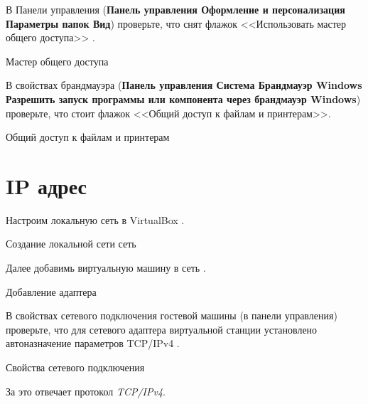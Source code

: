В Панели управления (\textbf{Панель управления
\rarrow Оформление и персонализация \rarrow Параметры папок \rarrow Вид})
проверьте, что снят флажок <<Использовать мастер общего доступа>>
.

\begin{image}
	\caption{Мастер общего доступа}
	\label{fig:flag:master:share}
\end{image}

В свойствах брандмауэра (\textbf{Панель управления \rarrow Система
\rarrow Брандмауэр Windows
\rarrow Разрешить запуск программы или компонента через брандмауэр Windows})
проверьте, что стоит флажок <<Общий доступ к файлам и принтерам>>.

\begin{image}
	\caption{Общий доступ к файлам и принтерам}
	\label{fig:flag:share:file}
\end{image}

\section{IP адрес}

Настроим локальную сеть в VirtualBox .

\begin{image}
	\caption{Создание локальной сети сеть}
	\label{fig:host:only:net}
\end{image}

Далее добавимь виртуальную машину в сеть .

\begin{image}
	\caption{Добавление адаптера}
	\label{fig:add:net:adapter}
\end{image}

В свойствах сетевого подключения гостевой машины (в панели управления)
проверьте, что для сетевого адаптера виртуальной станции установлено
автоназначение параметров TCP/IPv4 .

\begin{image}
	\caption{Свойства сетевого подключения}
	\label{fig:spec:net:connection}
\end{image}

За это отвечает протокол \textit{TCP/IPv4}.

